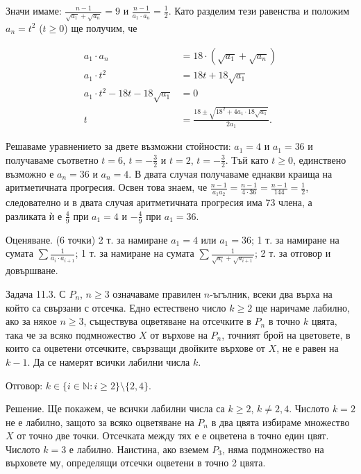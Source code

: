 Значи имаме: $\frac{n-1}{\sqrt{a_1}+\sqrt{a_n}}=9$ и $\frac{n-1}{a_1\cdot a_n}=\frac12$. Като разделим тези равенства и положим $a_n=t^2$ ($t\ge0$) ще получим, че

$$\begin{aligned}
a_1\cdot a_n&=18\cdot(\sqrt{a_1}+\sqrt{a_n})\\
a_1\cdot t^2&=18t+18\sqrt{a_1}\\
a_1\cdot t^2-18t-18\sqrt{a_1}&=0\\
t&=\frac{18\pm\sqrt{18^2+4a_1\cdot18\sqrt{a_1}}}{2a_1}.
\end{aligned}$$

Решаваме уравнението за двете възможни стойности: $a_1=4$ и $a_1=36$ и получаваме съответно $t=6$, $t=-\frac32$ и $t=2$, $t=-\frac32$. Тъй като $t\ge0$, единствено възможно е $a_n=36$ и $a_n=4$. В двата случая получаваме еднакви краища на аритметичната прогресия. Освен това знаем, че $\frac{n-1}{a_1a_2}=\frac{n-1}{4\cdot36}=\frac{n-1}{144}=\frac12$, следователно и в двата случая аритметичната прогресия има 73 члена, а разликата ѝ е $\frac49$ при $a_1=4$ и $-\frac49$ при $a_1=36$.

Оценяване. (6 точки) 2 т. за намиране $a_1=4$ или $a_1=36$; 1 т. за намиране на сумата $\sum\frac1{a_i\cdot a_{i+1}}$; 1 т. за намиране на сумата $\sum\frac1{\sqrt{a_i}+\sqrt{a_{i+1}}}$; 2 т. за отговор и довършване.

Задача 11.3. С $P_n$, $n\ge3$ означаваме правилен $n$-ъгълник, всеки два върха на който са свързани с отсечка. Едно естествено число $k\ge2$ ще наричаме лабилно, ако за някое $n\ge3$, съществува оцветяване на отсечките в $P_n$ в точно $k$ цвята, така че за всяко подмножество $X$ от върхове на $P_n$, точният брой на цветовете, в които са оцветени отсечките, свързващи двойките върхове от $X$, не е равен на $k-1$. Да се намерят всички лабилни числа $k$.

Отговор: $k\in\{i\in\mathbb N:i\ge2\}\setminus\{2,4\}$.

Решение. Ще покажем, че всички лабилни числа са $k\ge2$, $k\ne2,4$. Числото $k=2$ не е лабилно, защото за всяко оцветяване на $P_n$ в два цвята избираме множество $X$ от точно две точки. Отсечката между тях е е оцветена в точно един цвят. Числото $k=3$ е лабилно. Наистина, ако вземем $P_3$, няма подмножество на върховете му, определящи отсечки оцветени в точно 2 цвята.

